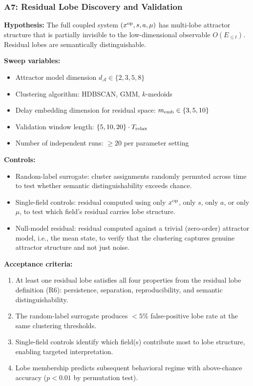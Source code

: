 \subsubsection*{A7: Residual Lobe Discovery and Validation}

\textbf{Hypothesis:} The full coupled system $(x^{\rm op},s,a,\mu)$ has
multi-lobe attractor structure that is partially invisible to the low-dimensional
observable $O(E_{\le t})$.  Residual lobes are semantically distinguishable.

\textbf{Sweep variables:}
\begin{itemize}
  \item Attractor model dimension $d_{\mathcal A}\in\{2,3,5,8\}$
  \item Clustering algorithm: HDBSCAN, GMM, $k$-medoids
  \item Delay embedding dimension for residual space: $m_{\rm emb}\in\{3,5,10\}$
  \item Validation window length: $\{5,10,20\}\cdot T_{\rm relax}$
  \item Number of independent runs: $\ge 20$ per parameter setting
\end{itemize}

\textbf{Controls:}
\begin{itemize}
  \item Random-label surrogate: cluster assignments randomly permuted across
        time to test whether semantic distinguishability exceeds chance.
  \item Single-field controls: residual computed using only $x^{\rm op}$, only
        $s$, only $a$, or only $\mu$, to test which field's residual carries
        lobe structure.
  \item Null-model residual: residual computed against a trivial (zero-order)
        attractor model, i.e., the mean state, to verify that the clustering
        captures genuine attractor structure and not just noise.
\end{itemize}

\textbf{Acceptance criteria:}
\begin{enumerate}
  \item At least one residual lobe satisfies all four properties from the
        residual lobe definition (R6): persistence, separation, reproducibility,
        and semantic distinguishability.
  \item The random-label surrogate produces $<5\%$ false-positive lobe rate
        at the same clustering thresholds.
  \item Single-field controls identify which field(s) contribute most to lobe
        structure, enabling targeted interpretation.
  \item Lobe membership predicts subsequent behavioral regime with above-chance
        accuracy ($p<0.01$ by permutation test).
\end{enumerate}

